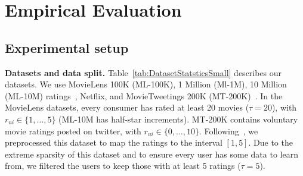 \section{Empirical Evaluation}
\label{sec:Experiments}
\subsection{Experimental setup}
\label{sec:ExpSetup}
\noindent \textbf{Datasets and data split. }Table~\ref{tab:DatasetStatsticsSmall} describes our datasets. 
We use MovieLens 100K (ML-100K), 1 Million (Ml-1M), 10 Million (ML-10M) ratings~\cite{harper2016movielens}, Netflix, and 
MovieTweetings 200K (MT-200K)~\cite{dooms2013movietweetings}.  In the MovieLens datasets, every consumer has rated at least 20 movies ($\tau = 20$), with  $r_{ui} \in \{ 1, \dots, 5\} $ (ML-10M has half-star increments). %
MT-200K  contains voluntary movie ratings posted on twitter, with $r_{ui} \in \{ 0, \dots, 10\} $.  Following~\cite{hernandez2014probabilistic}, we preprocessed this dataset to map the ratings to  the interval $[1,5]$. Due to the extreme sparsity of this dataset and to ensure every user has some data to learn from, we   filtered the users to  keep those with at least 5 ratings ($\tau = 5$). 


\iffalse
